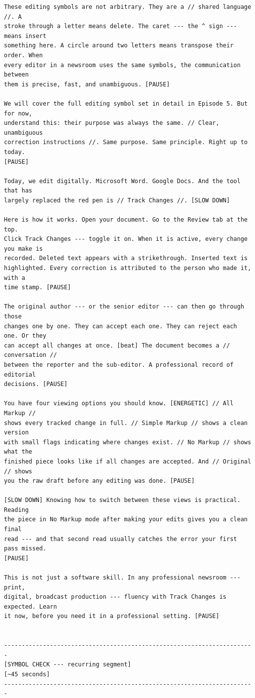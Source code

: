 {\begin{Verbatim}
These editing symbols are not arbitrary. They are a // shared language //. A
stroke through a letter means delete. The caret --- the ^ sign --- means insert
something here. A circle around two letters means transpose their order. When
every editor in a newsroom uses the same symbols, the communication between
them is precise, fast, and unambiguous. [PAUSE]

We will cover the full editing symbol set in detail in Episode 5. But for now,
understand this: their purpose was always the same. // Clear, unambiguous
correction instructions //. Same purpose. Same principle. Right up to today.
[PAUSE]

Today, we edit digitally. Microsoft Word. Google Docs. And the tool that has
largely replaced the red pen is // Track Changes //. [SLOW DOWN]

Here is how it works. Open your document. Go to the Review tab at the top.
Click Track Changes --- toggle it on. When it is active, every change you make is
recorded. Deleted text appears with a strikethrough. Inserted text is
highlighted. Every correction is attributed to the person who made it, with a
time stamp. [PAUSE]

The original author --- or the senior editor --- can then go through those
changes one by one. They can accept each one. They can reject each one. Or they
can accept all changes at once. [beat] The document becomes a // conversation //
between the reporter and the sub-editor. A professional record of editorial
decisions. [PAUSE]

You have four viewing options you should know. [ENERGETIC] // All Markup //
shows every tracked change in full. // Simple Markup // shows a clean version
with small flags indicating where changes exist. // No Markup // shows what the
finished piece looks like if all changes are accepted. And // Original // shows
you the raw draft before any editing was done. [PAUSE]

[SLOW DOWN] Knowing how to switch between these views is practical. Reading
the piece in No Markup mode after making your edits gives you a clean final
read --- and that second read usually catches the error your first pass missed.
[PAUSE]

This is not just a software skill. In any professional newsroom --- print,
digital, broadcast production --- fluency with Track Changes is expected. Learn
it now, before you need it in a professional setting. [PAUSE]


-----------------------------------------------------------------------
[SYMBOL CHECK --- recurring segment]
[~45 seconds]
-----------------------------------------------------------------------


\end{Verbatim}}
